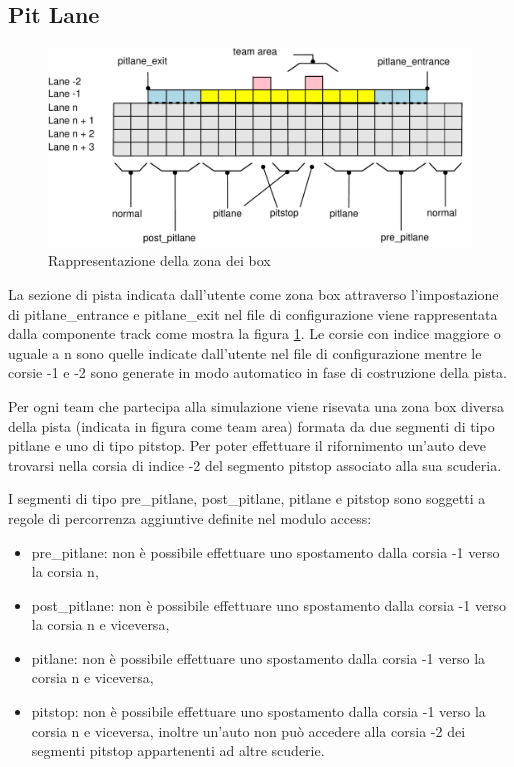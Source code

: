 \documentclass[11pt,a4paper]{report}
\begin{document}
\subsection{Pit Lane}
\begin{center}
\begin{figure}
\includegraphics[width=\textwidth]{diagrammi/PitLane}
\caption{Rappresentazione della zona dei box}
\label{fig:pitLane}
\end{figure}
\end{center}

La sezione di pista indicata dall'utente come zona box attraverso l'impostazione di pitlane\_entrance e pitlane\_exit nel file di configurazione viene rappresentata dalla componente track come mostra la figura \ref{fig:pitLane}. Le corsie con indice maggiore o uguale a n sono quelle indicate dall'utente nel file di configurazione mentre le corsie -1 e -2 sono generate in modo automatico in fase di costruzione della pista.

Per ogni team che partecipa alla simulazione viene risevata una zona box diversa della pista (indicata in figura come team area) formata da due segmenti di tipo pitlane e uno di tipo pitstop. Per poter effettuare il rifornimento un'auto deve trovarsi nella corsia di indice -2 del segmento pitstop associato alla sua scuderia.

I segmenti di tipo pre\_pitlane, post\_pitlane, pitlane e pitstop sono soggetti a regole di percorrenza aggiuntive definite nel modulo access:
\begin{itemize}
\item pre\_pitlane: non è possibile effettuare uno spostamento dalla corsia -1 verso la corsia n,
\item post\_pitlane: non è possibile effettuare uno spostamento dalla corsia -1 verso la corsia n e viceversa,
\item pitlane: non è possibile effettuare uno spostamento dalla corsia -1 verso la corsia n e viceversa,
\item pitstop: non è possibile effettuare uno spostamento dalla corsia -1 verso la corsia n e viceversa, inoltre un'auto non può accedere alla corsia -2 dei segmenti pitstop appartenenti ad altre scuderie.
\end{itemize}
\end{document}
